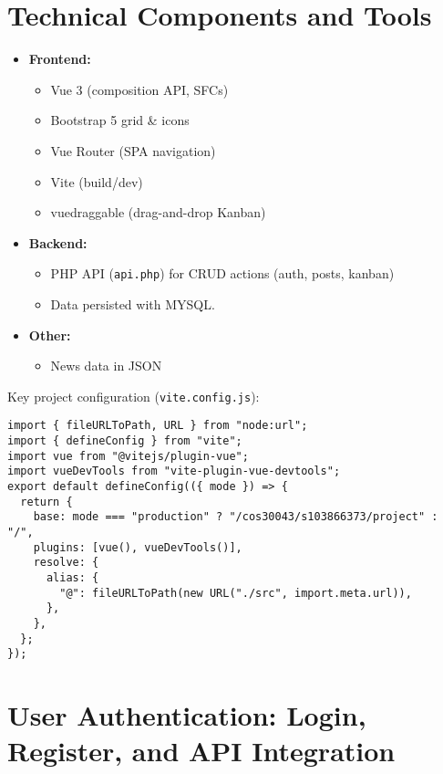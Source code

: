 \documentclass[11pt,a4paper]{article}
\begin{document}
\section*{Technical Components and Tools}

\begin{itemize}
    \item \textbf{Frontend:}
    \begin{itemize}
        \item Vue 3 (composition API, SFCs)
        \item Bootstrap 5 grid \& icons
        \item Vue Router (SPA navigation)
        \item Vite (build/dev)
        \item vuedraggable (drag-and-drop Kanban)
    \end{itemize}
    \item \textbf{Backend:}
    \begin{itemize}
        \item PHP API (\texttt{api.php}) for CRUD actions (auth, posts, kanban)
        \item Data persisted with MYSQL.
    \end{itemize}
    \item \textbf{Other:}
    \begin{itemize}
        \item News data in JSON
    \end{itemize}
\end{itemize}

\vspace{1em}
Key project configuration (\texttt{vite.config.js}):
\begin{verbatim}
import { fileURLToPath, URL } from "node:url";
import { defineConfig } from "vite";
import vue from "@vitejs/plugin-vue";
import vueDevTools from "vite-plugin-vue-devtools";
export default defineConfig(({ mode }) => {
  return {
    base: mode === "production" ? "/cos30043/s103866373/project" : "/",
    plugins: [vue(), vueDevTools()],
    resolve: {
      alias: {
        "@": fileURLToPath(new URL("./src", import.meta.url)),
      },
    },
  };
});
\end{verbatim}

\section*{User Authentication: Login, Register, and API Integration}
\end{document}
